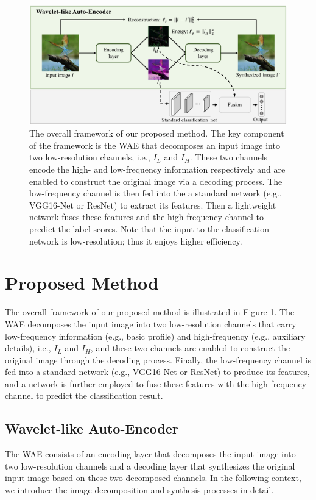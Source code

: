\documentclass[letterpaper]{article} %
\begin{document}
\begin{figure}[htbp]
\centering
\includegraphics[width=0.75\linewidth]{framework_v2.pdf}
\caption{The overall framework of our proposed method. The key component of the framework is the WAE that decomposes an input image into two low-resolution channels, i.e., $I_L$ and $I_H$. These two channels encode the high- and low-frequency information respectively and are enabled to construct the original image via a decoding process. The low-frequency channel is then fed into the a standard network (e.g., VGG16-Net or ResNet) to extract its features. Then a lightweight network fuses these features and the high-frequency channel to predict the label scores. Note that the input to the classification network is low-resolution; thus it enjoys higher efficiency.}
\label{fig:cls_net}
\end{figure}

\section{Proposed Method}
The overall framework of our proposed method is illustrated in Figure \ref{fig:cls_net}. The WAE decomposes the input image into two low-resolution channels that carry low-frequency information (e.g., basic profile) and high-frequency (e.g., auxiliary details), i.e., $I_L$ and $I_H$, and these two channels are enabled to construct the original image through the decoding process. Finally, the low-frequency channel is fed into a standard network (e.g., VGG16-Net or ResNet) to produce its features, and a network is further employed to fuse these features with the high-frequency channel to predict the classification result.

\subsection{Wavelet-like Auto-Encoder}
The WAE consists of an encoding layer that decomposes the input image into two low-resolution channels and a decoding layer that synthesizes the original input image based on these two decomposed channels. In the following context, we introduce the image decomposition and synthesis processes in detail.
\end{document}
